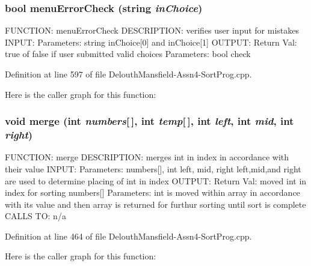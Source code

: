 \hypertarget{_delouth_mansfield-_assn4-_sort_prog_8cpp_a3fcd92b059e256a9f46866c6d1e2b1e4}{
\subsubsection[{menuErrorCheck}]{\setlength{\rightskip}{0pt plus 5cm}bool menuErrorCheck (string {\em inChoice})}}
\label{_delouth_mansfield-_assn4-_sort_prog_8cpp_a3fcd92b059e256a9f46866c6d1e2b1e4}
FUNCTION: menuErrorCheck DESCRIPTION: verifies user input for mistakes INPUT: Parameters: string inChoice\mbox{[}0\mbox{]} and inChoice\mbox{[}1\mbox{]} OUTPUT: Return Val: true of false if user submitted valid choices Parameters: bool check 

Definition at line 597 of file DelouthMansfield-\/Assn4-\/SortProg.cpp.



Here is the caller graph for this function:

\hypertarget{_delouth_mansfield-_assn4-_sort_prog_8cpp_a22dd5c604dfcb67bc46bfd4bbb97d2f0}{
\subsubsection[{merge}]{\setlength{\rightskip}{0pt plus 5cm}void merge (int {\em numbers}\mbox{[}$\,$\mbox{]}, \/  int {\em temp}\mbox{[}$\,$\mbox{]}, \/  int {\em left}, \/  int {\em mid}, \/  int {\em right})}}
\label{_delouth_mansfield-_assn4-_sort_prog_8cpp_a22dd5c604dfcb67bc46bfd4bbb97d2f0}
FUNCTION: merge DESCRIPTION: merges int in index in accordance with their value INPUT: Parameters: numbers\mbox{[}\mbox{]}, int left, mid, right left,mid,and right are used to determine placing of int in index OUTPUT: Return Val: moved int in index for sorting numbers\mbox{[}\mbox{]} Parameters: int is moved within array in accordance with its value and then array is returned for furthur sorting until sort is complete CALLS TO: n/a 

Definition at line 464 of file DelouthMansfield-\/Assn4-\/SortProg.cpp.



Here is the caller graph for this function:

